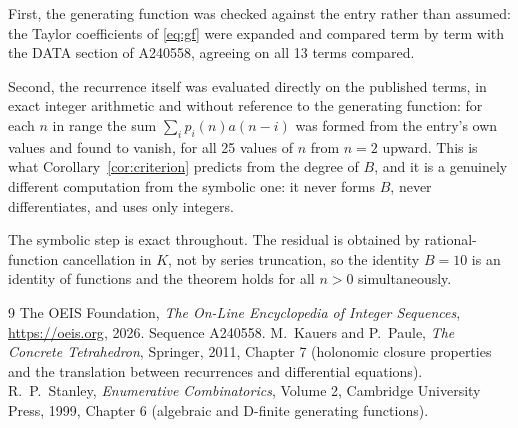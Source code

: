 \documentclass[11pt,a4paper]{article}
\theoremstyle{plain}
\theoremstyle{definition}
\begin{document}
First, the generating function was checked against the entry rather than assumed: the
Taylor coefficients of \eqref{eq:gf} were expanded and compared term by term with the DATA
section of A240558, agreeing on all 13 terms compared.

Second, the recurrence itself was evaluated directly on the published terms, in exact
integer arithmetic and without reference to the generating function: for each $n$ in range
the sum $\sum_{i}p_{i}(n)a(n-i)$ was formed from the entry's own values and found to
vanish, for all 25 values of $n$ from $n=2$ upward. This is what
Corollary~\ref{cor:criterion} predicts from the degree of $B$, and it is a genuinely
different computation from the symbolic one: it never forms $B$, never differentiates, and
uses only integers.

The symbolic step is exact throughout. The residual is obtained by rational-function
cancellation in $K$, not by series truncation, so the identity $B=10$ is an
identity of functions and the theorem holds for all $n>0$ simultaneously.

\begin{thebibliography}{9}
 The OEIS Foundation, \emph{The On-Line Encyclopedia of Integer Sequences},
\url{https://oeis.org}, 2026. Sequence A240558.
 M.~Kauers and P.~Paule, \emph{The Concrete Tetrahedron}, Springer, 2011,
Chapter 7 (holonomic closure properties and the translation between recurrences and
differential equations).
 R.~P.~Stanley, \emph{Enumerative Combinatorics}, Volume 2, Cambridge
University Press, 1999, Chapter 6 (algebraic and D-finite generating functions).
\end{thebibliography}
\end{document}
